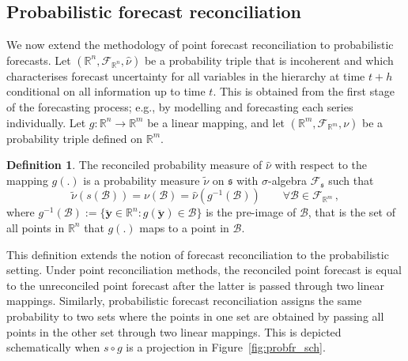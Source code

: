 \documentclass[a4paper, 11pt]{article}
\theoremstyle{definition}
\newtheorem{definition}{Definition}[section]
\begin{document}
\subsection{Probabilistic forecast reconciliation}

We now extend the methodology of point forecast reconciliation to probabilistic forecasts.
Let $(\mathbb{R}^n, \mathscr{F}_{\mathbb{R}^n}, \hat{\nu})$ be a probability triple that is incoherent and which characterises forecast uncertainty for all variables in the hierarchy at time $t+h$ conditional on all information up to time $t$. This is obtained from the first stage of the forecasting process; e.g., by modelling and forecasting each series individually. Let $g:\mathbb{R}^n \rightarrow \mathbb{R}^m $ be a linear mapping, and let $(\mathbb{R}^m, \mathscr{F}_{\mathbb{R}^m}, \nu)$ be a probability triple defined on $\mathbb{R}^m$.

\begin{definition} \label{def:reconprob}
  The reconciled probability measure of $\hat{\nu}$ with respect to the mapping $g(.)$ is a probability measure $\tilde{\nu}$ on $\mathfrak{s}$ with $\sigma$-algebra $\mathscr{F}_\mathfrak{s}$ such that
  \begin{equation}
  \tilde{\nu}(s(\mathcal{B})) = \nu(\mathcal{B})= \hat{\nu}(g^{-1}(\mathcal{B})) \qquad \forall \mathcal{B} \in \mathscr{F}_{\mathbb{R}^m}\,,
  \end{equation}
  where $g^{-1}(\mathcal{B}):=\{\breve{\bm{y}}\in \mathbb{R}^n:g(\breve{\bm{y}})\in \mathcal{B}\}$ is the pre-image of $\mathcal{B}$, that is the set of all points in $\mathbb{R}^n$ that $g(.)$ maps to a point in $\mathcal{B}$.
\end{definition}

This definition extends the notion of forecast reconciliation to the probabilistic setting. Under point reconciliation methods, the reconciled point forecast is equal to the unreconciled point forecast after the latter is passed through two linear mappings. Similarly, probabilistic forecast reconciliation assigns the same probability to two sets where the points in one set are obtained by passing all points in the other set through two linear mappings. This is depicted schematically when $s\circ g$ is a projection in Figure~\ref{fig:probfr_sch}.
\end{document}
